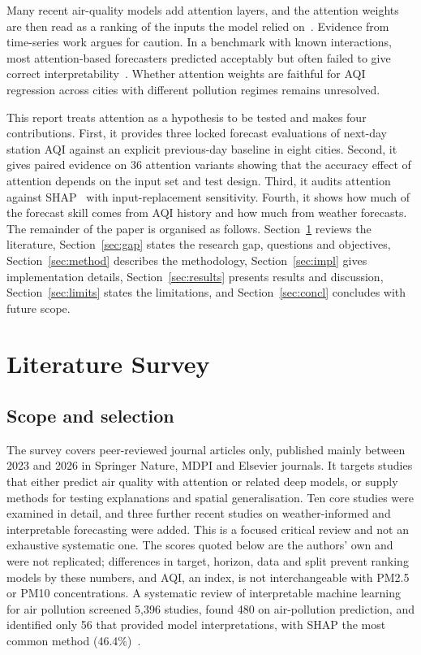 \documentclass[pdflatex,sn-mathphys-num]{sn-jnl}
\begin{document}
Many recent air-quality models add attention layers, and the attention weights are then read as a ranking of the inputs the model relied on~\cite{chen23,liu23,ma}. Evidence from time-series work argues for caution. In a benchmark with known interactions, most attention-based forecasters predicted acceptably but often failed to give correct interpretability~\cite{entropy}. Whether attention weights are faithful for AQI regression across cities with different pollution regimes remains unresolved.

This report treats attention as a hypothesis to be tested and makes four contributions. First, it provides three locked forecast evaluations of next-day station AQI against an explicit previous-day baseline in eight cities. Second, it gives paired evidence on 36 attention variants showing that the accuracy effect of attention depends on the input set and test design. Third, it audits attention against SHAP~\cite{lundberg} with input-replacement sensitivity. Fourth, it shows how much of the forecast skill comes from AQI history and how much from weather forecasts. The remainder of the paper is organised as follows. Section~\ref{sec:survey} reviews the literature, Section~\ref{sec:gap} states the research gap, questions and objectives, Section~\ref{sec:method} describes the methodology, Section~\ref{sec:impl} gives implementation details, Section~\ref{sec:results} presents results and discussion, Section~\ref{sec:limits} states the limitations, and Section~\ref{sec:concl} concludes with future scope.

\section{Literature Survey}\label{sec:survey}

\subsection{Scope and selection}
The survey covers peer-reviewed journal articles only, published mainly between 2023 and 2026 in Springer Nature, MDPI and Elsevier journals. It targets studies that either predict air quality with attention or related deep models, or supply methods for testing explanations and spatial generalisation. Ten core studies were examined in detail, and three further recent studies on weather-informed and interpretable forecasting were added. This is a focused critical review and not an exhaustive systematic one. The scores quoted below are the authors' own and were not replicated; differences in target, horizon, data and split prevent ranking models by these numbers, and AQI, an index, is not interchangeable with PM2.5 or PM10 concentrations. A systematic review of interpretable machine learning for air pollution screened 5,396 studies, found 480 on air-pollution prediction, and identified only 56 that provided model interpretations, with SHAP the most common method (46.4\%)~\cite{houdou}.
\end{document}
